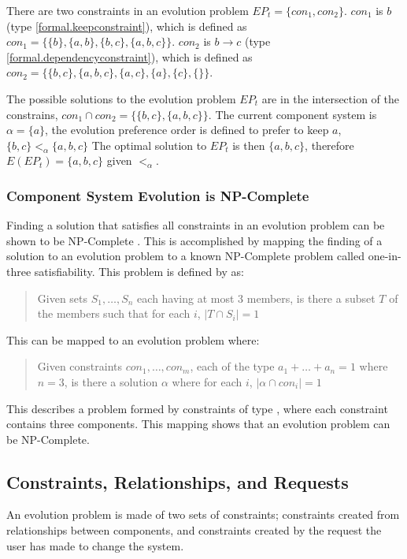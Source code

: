 There are two constraints in an evolution problem $EP_t = \{con_1,con_2\}$.
$con_1$ is $b$ (type \ref{formal.keepconstraint}), which is defined as $con_1 = \{\{b\},\{a,b\},\{b,c\},\{a,b,c\}\}$.
$con_2$ is $b \rightarrow c$ (type \ref{formal.dependencyconstraint}), which is defined as $con_2 = \{\{b,c\},\{a,b,c\},\{a,c\},\{a\},\{c\},\{\}\}$.

The possible solutions to the evolution problem $EP_t$ are in the intersection of the constrains, $con_1 \cap con_2 = \{\{b,c\},\{a,b,c\}\}$.
The current component system is $\alpha = \{a\}$, the evolution preference order is defined to prefer to keep $a$,  $\{b,c\} <_{\alpha} \{a,b,c\}$
The optimal solution to $EP_t$ is then $\{a,b,c\}$, therefore $E(EP_t) = \{a,b,c\}$ given $<_{\alpha}$.

\subsubsection{Component System Evolution is NP-Complete}
Finding a solution that satisfies all constraints in an evolution problem can be shown to be NP-Complete \citep{cook1971}.
This is accomplished by mapping the finding of a solution to an evolution problem to a known NP-Complete problem called one-in-three satisfiability.
This problem is defined by \cite{Schaefer1978} as:
\begin{quote}
Given sets $S_1, \ldots, S_n$ each having at most 3 members, is there a subset $T$ of the members such that for each $i$, $|T \cap S_i|  =  1$
\end{quote}

This can be mapped to an evolution problem where:
\begin{quote}
Given constraints $con_1,\ldots,con_m$, each of the type  $a_1 + \ldots + a_n = 1$ where $n = 3$, is there a solution $\alpha$ where for each $i$, $|\alpha \cap con_i|  =  1$
\end{quote}
This describes a problem formed by constraints of type \label{formal.upgradeconstraint}, where each constraint contains three components.
This mapping shows that an evolution problem can be NP-Complete.

\subsection{Constraints, Relationships, and Requests}
\label{formal.constraints}
An evolution problem is made of two sets of constraints; constraints created from relationships between components, 
and constraints created by the request the user has made to change the system.

